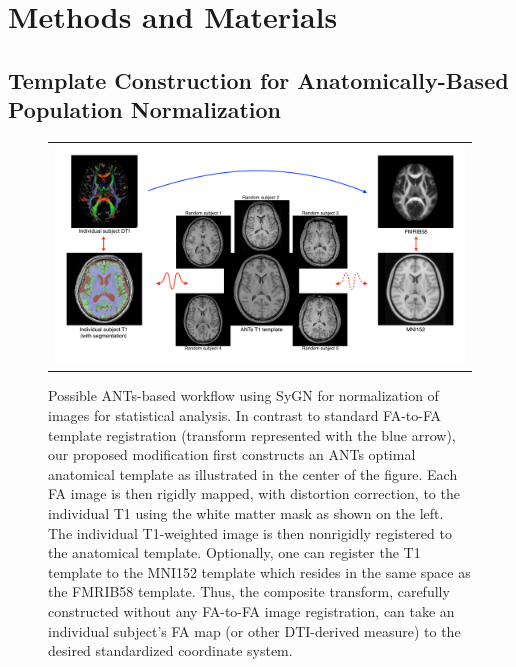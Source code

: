 \documentclass[final,5p,times,twocolumn]{elsarticle}
\begin{document}
\section{Methods and Materials}

\subsection{Template Construction for Anatomically-Based Population Normalization}

\begin{figure}
\begin{center}
\begin{tabular}{c}
  \includegraphics[width=170mm]{workflow.pdf}
\end{tabular}
\caption{Possible ANTs-based workflow using SyGN for normalization of images for statistical analysis.  In contrast to standard  FA-to-FA template registration
(transform represented with the blue arrow), our proposed modification first constructs an ANTs optimal anatomical template as illustrated in the center of the figure.  Each FA image is then rigidly mapped, with distortion correction, to the individual T1 using the white matter mask as shown on the left.  The individual T1-weighted image is then nonrigidly registered to the anatomical template.  Optionally, one can register the T1 template to the MNI152 template which resides in the same space as the FMRIB58 template.  Thus, the composite transform, carefully constructed without any FA-to-FA image registration, can take an individual subject's FA map (or other DTI-derived measure) to the desired standardized coordinate system.    }
\label{fig:workflow}
\end{center}
\end{figure}
\end{document}
